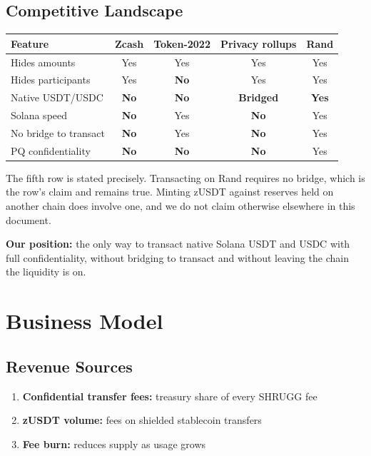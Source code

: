 \documentclass[11pt,a4paper]{article}
\begin{document}
\subsection{Competitive Landscape}

\begin{table}[h]
\centering
\begin{tabular}{@{}lcccc@{}}
\toprule
\textbf{Feature} & \textbf{Zcash} & \textbf{Token-2022} & \textbf{Privacy rollups} & \textbf{Rand} \\ \midrule
Hides amounts & Yes & Yes & Yes & Yes \\
Hides participants & Yes & \textbf{No} & Yes & Yes \\
Native USDT/USDC & \textbf{No} & \textbf{No} & \textbf{Bridged} & \textbf{Yes} \\
Solana speed & \textbf{No} & Yes & \textbf{No} & Yes \\
No bridge to transact & \textbf{No} & Yes & \textbf{No} & Yes \\
PQ confidentiality & \textbf{No} & \textbf{No} & \textbf{No} & Yes \\ \bottomrule
\end{tabular}
\end{table}

The fifth row is stated precisely. Transacting on Rand requires no bridge, which is the row's claim and remains true. Minting zUSDT against reserves held on another chain does involve one, and we do not claim otherwise elsewhere in this document.

\textbf{Our position:} the only way to transact native Solana USDT and USDC with full confidentiality, without bridging to transact and without leaving the chain the liquidity is on.

\section{Business Model}

\subsection{Revenue Sources}

\begin{enumerate}[leftmargin=*]
    \item \textbf{Confidential transfer fees:} treasury share of every SHRUGG fee
    \item \textbf{zUSDT volume:} fees on shielded stablecoin transfers
    \item \textbf{Fee burn:} reduces supply as usage grows
\end{enumerate}
\end{document}
